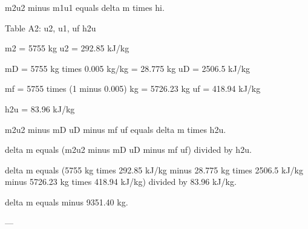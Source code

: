 m2u2 minus m1u1 equals delta m times hi.  

Table A2:  
u2, u1, uf  
h2u  

m2 = 5755 kg  
u2 = 292.85 kJ/kg  

mD = 5755 kg times 0.005 kg/kg = 28.775 kg  
uD = 2506.5 kJ/kg  

mf = 5755 times (1 minus 0.005) kg = 5726.23 kg  
uf = 418.94 kJ/kg  

h2u = 83.96 kJ/kg  

m2u2 minus mD uD minus mf uf equals delta m times h2u.  

delta m equals (m2u2 minus mD uD minus mf uf) divided by h2u.  

delta m equals (5755 kg times 292.85 kJ/kg minus 28.775 kg times 2506.5 kJ/kg minus 5726.23 kg times 418.94 kJ/kg) divided by 83.96 kJ/kg.  

delta m equals minus 9351.40 kg.  

---